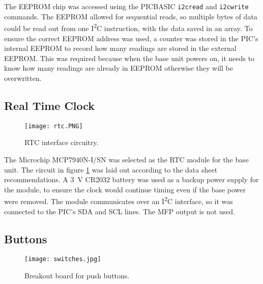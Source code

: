 The EEPROM chip was accessed using the PICBASIC \verb|i2cread| and \verb|i2cwrite| commands. The EEPROM allowed for sequential reads, so multiple bytes of data could be read out from one I\textsuperscript{2}C instruction, with the data saved in an array. To ensure the correct EEPROM address was used, a counter was stored in the PIC's internal EEPROM to record how many readings are stored in the external EEPROM. This was required because when the base unit powers on, it needs to know how many readings are already in EEPROM otherwise they will be overwritten.\\





\subsection{Real Time Clock}
\begin{figure}[htbp]
	\centering
	\texttt{[image: rtc.PNG]}
	\caption{RTC interface circuitry.}
	\label{fig: rtc schematic}
\end{figure}

The Microchip MCP7940N-I/SN \cite{rtc} was selected as the RTC module for the base unit. The circuit in figure \ref{fig: rtc schematic} was laid out according to the data sheet \cite{rtc} recommendations. A \SI{3}{\volt} CR2032 battery was used as a backup power supply for the module, to ensure the clock would continue timing even if the base power were removed. The module communicates over an I\textsuperscript{2}C interface, so it was connected to the PIC's SDA and SCL lines. The MFP output is not used.





\subsection{Buttons}
\begin{figure}[htbp]
	\centering
	\texttt{[image: switches.jpg]}
	\caption{Breakout board for push buttons.}
	\label{fig: buttons}
\end{figure}

